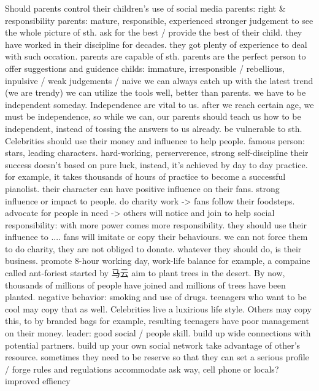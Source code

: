 \documentclass{ctexart}
\begin{document}
\begin{outline}
    \1 Should parents control their children's use of social media  
        \2 parents: right \& responsibility
        \2 parents: mature, responsible, experienced
            \3 stronger judgement to see the whole picture of sth.
            \3 ask for the best / provide the best of their child.
            \3 they have worked in their discipline for decades.
                \4 they got plenty of experience to deal with such occation.
                \4 parents are capable of sth.
            \3 parents are the perfect person to offer suggestions and guidence
        \2 childs: immature, irresponsible / rebellious, inpulsive / weak judgements / naive
            \3 we can always catch up with the latest trend (we are trendy)
                \4 we can utilize the tools well, better than parents.
            \3 we have to be independent someday. 
                \4 Independence are vital to us. after we reach certain age, we must be independence, so while we can, our parents should teach us how to be independent, instead of tossing the answers to us already.
        \2 be vulnerable to sth.
    \1 Celebrities should use their money and influence to help people.
        \2 famous person: stars, leading characters.
            \3 hard-working, perserverence, strong self-discipline
                \4 their success doesn't based on pure luck, instead, it's achieved by day to day practice.
                \4 for example, it takes thousands of hours of practice to become a successful pianolist. their character can have positive influence on their fans.
            \3 strong influence or impact to people.
                \4 do charity work -> fans follow their foodsteps.
                \4 advocate for people in need -> others will notice and join to help
        \2 social responsibility:
            \3 with more power comes more responsibility.
            \3 they should use their influence to ....
            \3 fans will imitate or copy their behaviours.
        \2 we can not force them to do charity, they are not obliged to donate. whatever they should do, is their business.
        \2 promote 8-hour working day, work-life balance
        \2 for example, a compaine called ant-foriest started by 马云 aim to plant trees in the desert. By now, thousands of millions of people have joined and millions of trees have been planted.
    \1 negative behavior: smoking and use of drugs.
        \2 teenagers who want to be cool may copy that as well.
    \1 Celebrities live a luxirious life style. Others may copy this, to by branded bags for example, resulting teenagers have poor management on their money.
    \1 leader:
        \2 good social / people skill.
        \2 build up wide connections with potential partners.
        \2 build up your own social network
        \2 take advantage of other's resource.
        \2 
        \2 sometimes they need to be reserve so that they can  set a serious profile / forge rules and regulations
    \1 accommodate
    \1 ask way, cell phone or locals?
        \2 improved effiency
\end{outline}
\end{document}

